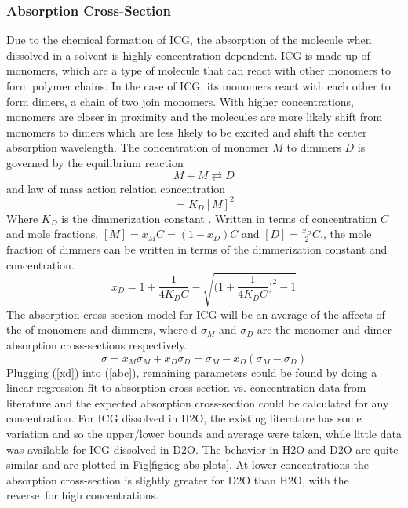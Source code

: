 \subsubsection{ Absorption Cross-Section}
Due to the chemical formation of ICG, the absorption of the molecule when dissolved in a solvent is highly concentration-dependent. ICG is made up of monomers, which are a type of molecule that can react with other monomers to form polymer chains. In the case of ICG, its monomers react with each other to form dimers, a chain of two join monomers. With higher concentrations, monomers are closer in proximity and the molecules are more likely shift from monomers to dimers which are less likely to be excited and shift the center absorption wavelength. The concentration of monomer $M$ to dimmers $D$ is governed by the equilibrium reaction
\begin{equation}
	M+M\rightleftarrows D
\end{equation}
and law of mass action relation concentration 
\begin{equation}
	[D] =  K_D[M]^2
\end{equation}
Where $K_D$ is the dimmerization constant . Written in terms of concentration $C$ and mole fractions, $[M] = x_MC= (1-x_D)C $ and $[D]=\frac{x_D}{2}C$., the  mole fraction of dimmers can be written in terms of the dimmerization constant and concentration.
\begin{equation}
	x_D = 1 + \frac{1}{4K_DC} - \sqrt{\big( 1 + \frac{1}{4K_DC}\big)^2-1}
	\label{xd}
\end{equation}
 The absorption cross-section model for ICG\cite{mauerer, philip} will be an average of the affects of the of monomers and dimmers, where d $\sigma_M$ and $\sigma_D$ are the monomer and dimer absorption cross-sections respectively.
\begin{equation}
	\sigma = x_M \sigma_M + x_D \sigma_D = \sigma_M - x_D(\sigma_M - \sigma_D)
	\label{abc}
\end{equation}
Plugging (\ref{xd}) into (\ref{abc}), remaining parameters could be found by doing a linear regression fit to absorption cross-section vs. concentration data from literature and the expected absorption cross-section could be calculated for any concentration. For ICG dissolved in H2O, the existing literature has some variation and so the upper/lower bounds and average were taken, while little data was available for ICG dissolved in D2O. The behavior in H2O and D2O are quite similar and are plotted in Fig\ref{fig:icg abs plots}. At lower concentrations the absorption cross-section is slightly greater for D2O than H2O, with the reverse for high concentrations.
